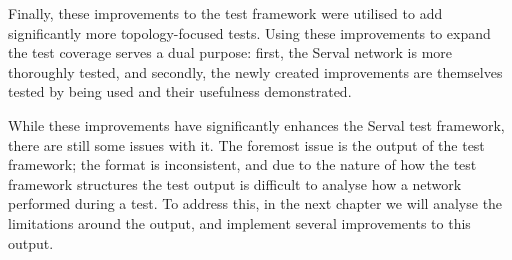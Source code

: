 Finally, these improvements to the test framework were utilised to add significantly more topology-focused tests.
Using these improvements to expand the test coverage serves a dual purpose: first, the Serval network is more thoroughly tested, and secondly, the newly created improvements are themselves tested by being used and their usefulness demonstrated.

While these improvements have significantly enhances the Serval test framework, there are still some issues with it.
The foremost issue is the output of the test framework; the format is inconsistent, and due to the nature of how the test framework structures the test output is difficult to analyse how a network performed during a test.
To address this, in the next chapter we will analyse the limitations around the output, and implement several improvements to this output.